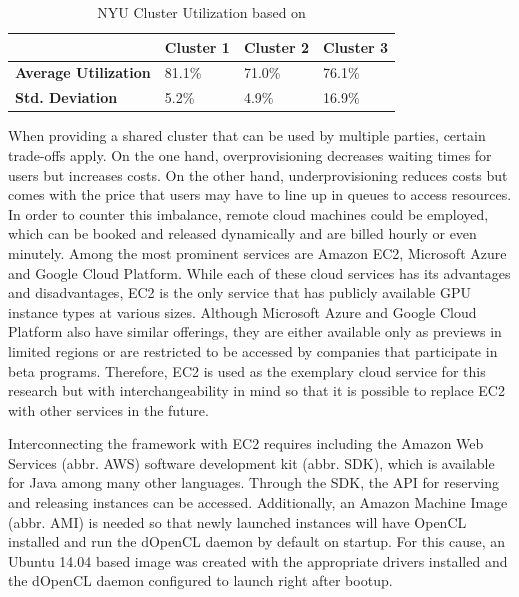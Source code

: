 \begin{table}[!htb]
	\centering
	\begin{adjustbox}{width=0.5\textwidth}
		\small
		\begin{tabular}{l | l | l | l}
			~						& \textbf{Cluster 1}	& \textbf{Cluster 2}	& \textbf{Cluster 3}                 \\
			\hline
			\textbf{Average Utilization} 	& 81.1\%  	& 71.0\% 	& 76.1\% \\
			\textbf{Std. Deviation}          & 5.2\%  	& 4.9\%		& 16.9\% \\
		\end{tabular}
	\end{adjustbox}

	\caption{NYU Cluster Utilization based on \cite{nyu}}
	\label{table:cluster_utilization}
\end{table}

When providing a shared cluster that can be used by multiple parties, certain trade-offs apply. On the one hand, overprovisioning decreases waiting times for users but increases costs. On the other hand, underprovisioning reduces costs but comes with the price that users may have to line up in queues to access resources. In order to counter this imbalance, remote cloud machines could be employed, which can be booked and released dynamically and are billed hourly or even minutely. Among the most prominent services are Amazon EC2, Microsoft Azure and Google Cloud Platform. While each of these cloud services has its advantages and disadvantages, EC2 is the only service that has publicly available GPU instance types at various sizes. Although Microsoft Azure and Google Cloud Platform also have similar offerings, they are either available only as previews in limited regions or are restricted to be accessed by companies that participate in beta programs. Therefore, EC2 is used as the exemplary cloud service for this research but with interchangeability in mind so that it is possible to replace EC2 with other services in the future.

Interconnecting the framework with EC2 requires including the Amazon Web Services (abbr. AWS) software development kit (abbr. SDK), which is available for Java among many other languages. Through the SDK, the API for reserving and releasing instances can be accessed. Additionally, an Amazon Machine Image (abbr. AMI) is needed so that newly launched instances will have OpenCL installed and run the dOpenCL daemon by default on startup. For this cause, an Ubuntu 14.04 based image was created with the appropriate drivers installed and the dOpenCL daemon configured to launch right after bootup.

